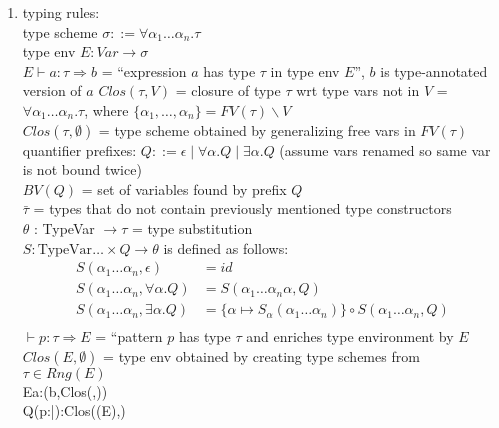 \documentclass[12pt]{article}	%
\begin{document}
\begin{enumerate}
	\item typing rules: \\
	type scheme $\sigma ::= \forall\alpha_1\ldots\alpha_n.\tau$\\
	type env $E : Var \rightarrow \sigma$\\
	$E\vdash a:\tau \Rightarrow b$ = ``expression $a$ has type $\tau$ in type env $E$'', $b$ is type-annotated version of $a$
	$Clos(\tau,V)$ = closure of type $\tau$ wrt type vars not in $V$ = $\forall\alpha_1\ldots\alpha_n.\tau$, where $\{\alpha_1,\ldots,\alpha_n\} = FV(\tau)\backslash V$\\
	$Clos(\tau,\emptyset)$ = type scheme obtained by generalizing free vars in $FV(\tau)$ \\
	quantifier prefixes: $Q ::= \epsilon \mid \forall\alpha.Q \mid \exists\alpha.Q$  (assume vars renamed so same var is not bound twice) \\
	$BV(Q)$ = set of variables found by prefix $Q$ \\
	$\bar{\tau}$ = types that do not contain previously mentioned type constructors \\
	$\theta$ : TypeVar $\rightarrow \tau$  = type substitution \\
	$S:\textrm{TypeVar}\ldots \times Q \rightarrow \theta$ is defined as follows:\\
	\begin{align*}
	S(\alpha_1\ldots\alpha_n,\epsilon)         &= id \\
	S(\alpha_1\ldots\alpha_n,\forall\alpha.Q)  &= S(\alpha_1\ldots\alpha_n\alpha,Q) \\
	S(\alpha_1\ldots\alpha_n,\exists\alpha.Q) &= \{\alpha\mapsto S_\alpha(\alpha_1\ldots\alpha_n)\} \circ S(\alpha_1\ldots\alpha_n,Q) \\
	\end{align*}
	$\vdash p:\tau\Rightarrow E$ = ``pattern $p$ has type $\tau$ and enriches type environment by $E$ \\
	$Clos(E,\emptyset)$ = type env obtained by creating type schemes from $\tau \in Rng(E)$\\
	          {E\vdash \dynamic\;a:\Dynamic\Rightarrow\dynamic(b,Clos(\tau,\emptyset))} \\
	          {Q\vdash\dynamic(p:\bar{\tau}):\Dynamic\Rightarrow Clos(\theta(E),\emptyset)}
	

\end{enumerate}
\end{document}
